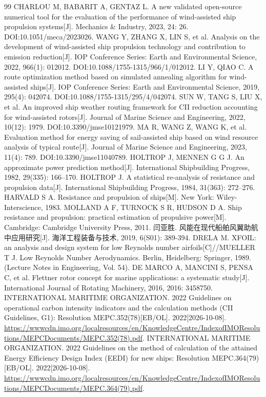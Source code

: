 \documentclass[UTF8,a4paper,twoside,zihao=5,fontset=windows]{ctexart}
\begin{document}
\begin{thebibliography}{99}
CHARLOU M, BABARIT A, GENTAZ L. A new validated open-source numerical tool for the evaluation of the performance of wind-assisted ship propulsion systems[J]. Mechanics \& Industry, 2023, 24: 26. DOI:10.1051/meca/2023026.
WANG Y, ZHANG X, LIN S, et al. Analysis on the development of wind-assisted ship propulsion technology and contribution to emission reduction[J]. IOP Conference Series: Earth and Environmental Science, 2022, 966(1): 012012. DOI:10.1088/1755-1315/966/1/012012.
LI Y, QIAO C. A route optimization method based on simulated annealing algorithm for wind-assisted ships[J]. IOP Conference Series: Earth and Environmental Science, 2019, 295(4): 042074. DOI:10.1088/1755-1315/295/4/042074.
SUN W, TANG S, LIU X, et al. An improved ship weather routing framework for CII reduction accounting for wind-assisted rotors[J]. Journal of Marine Science and Engineering, 2022, 10(12): 1979. DOI:10.3390/jmse10121979.
MA R, WANG Z, WANG K, et al. Evaluation method for energy saving of sail-assisted ship based on wind resource analysis of typical route[J]. Journal of Marine Science and Engineering, 2023, 11(4): 789. DOI:10.3390/jmse11040789.
HOLTROP J, MENNEN G G J. An approximate power prediction method[J]. International Shipbuilding Progress, 1982, 29(335): 166--170.
HOLTROP J. A statistical re-analysis of resistance and propulsion data[J]. International Shipbuilding Progress, 1984, 31(363): 272--276.
HARVALD S A. Resistance and propulsion of ships[M]. New York: Wiley-Interscience, 1983.
MOLLAND A F, TURNOCK S R, HUDSON D A. Ship resistance and propulsion: practical estimation of propulsive power[M]. Cambridge: Cambridge University Press, 2011.
闫亚胜. 风能在现代船舶风翼助航中应用研究[J]. 海洋工程装备与技术, 2019, 6(S01): 389-394.
DRELA M. XFOIL: an analysis and design system for low Reynolds number airfoils[C]//MUELLER T J. Low Reynolds Number Aerodynamics. Berlin, Heidelberg: Springer, 1989. (Lecture Notes in Engineering, Vol. 54).
DE MARCO A, MANCINI S, PENSA C, et al. Flettner rotor concept for marine applications: a systematic study[J]. International Journal of Rotating Machinery, 2016, 2016: 3458750.
INTERNATIONAL MARITIME ORGANIZATION. 2022 Guidelines on operational carbon intensity indicators and the calculation methods (CII Guidelines, G1): Resolution MEPC.352(78)[EB/OL]. 2022[2026-10-08]. \url{https://wwwcdn.imo.org/localresources/en/KnowledgeCentre/IndexofIMOResolutions/MEPCDocuments/MEPC.352(78).pdf}.
INTERNATIONAL MARITIME ORGANIZATION. 2022 Guidelines on the method of calculation of the attained Energy Efficiency Design Index (EEDI) for new ships: Resolution MEPC.364(79)[EB/OL]. 2022[2026-10-08]. \url{https://wwwcdn.imo.org/localresources/en/KnowledgeCentre/IndexofIMOResolutions/MEPCDocuments/MEPC.364(79).pdf}.
\end{thebibliography}
\endgroup
\end{document}
